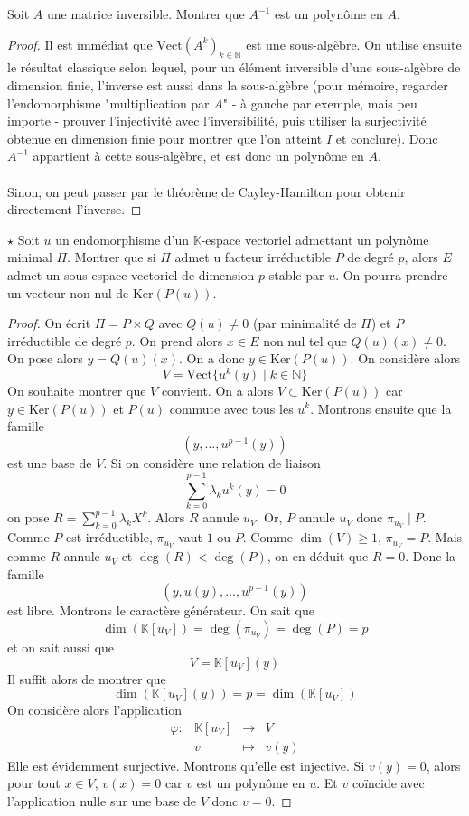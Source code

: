 \documentclass[french,a4paper]{article}
\newcommand{\N}{\mathbb{N}}
\newcommand{\K}{\mathbb{K}}
\newcommand{\inv}{^{-1}}
\renewcommand{\ker}{\text{Ker}}
\theoremstyle{plain}
\theoremstyle{definition}
\theoremstyle{remark}
\begin{document}
\begin{ex}{}
	Soit $A$ une matrice inversible. Montrer que $A\inv$ est un polynôme en $A$.
\end{ex}
\begin{proof}
	Il est immédiat que $\text{Vect}(A^k)_{k\in\N}$ est une sous-algèbre. On utilise ensuite le résultat classique selon lequel, pour un élément inversible d'une sous-algèbre de dimension finie, l'inverse est aussi dans la sous-algèbre (pour mémoire, regarder l'endomorphisme "multiplication par $A$" - à gauche par exemple, mais peu importe - prouver l'injectivité avec l'inversibilité, puis utiliser la surjectivité obtenue en dimension finie pour montrer que l'on atteint $I$ et conclure). Donc $A\inv$ appartient à cette sous-algèbre, et est donc un polynôme en $A$. \\ \\ Sinon, on peut passer par le théorème de Cayley-Hamilton pour obtenir directement l'inverse.
\end{proof}

\begin{ex}{$\star$}
	Soit $u$ un endomorphisme d'un $\K$-espace vectoriel admettant un polynôme minimal $\Pi$. Montrer que si $\Pi$ admet u facteur irréductible $P$ de degré $p$, alors $E$ admet un sous-espace vectoriel de dimension $p$ stable par $u$. On pourra prendre un vecteur non nul de $\ker(P(u))$.
\end{ex}
\begin{proof}
	On écrit $\Pi=P\times Q$ avec $Q(u)\ne0$ (par minimalité de $\Pi$) et $P$ irréductible de degré $p$. On prend alors $x\in E$ non nul tel que $Q(u)(x)\ne0$. On pose alors $y=Q(u)(x)$. On a donc $y\in\ker(P(u))$. On considère alors $$V=\text{Vect}\{u^k(y)\mid k\in\N\}$$ On souhaite montrer que $V$ convient. On a alors $V\subset \ker(P(u))$ car $y\in\ker(P(u))$ et $P(u)$ commute avec tous les $u^k$. Montrons ensuite que la famille $$(y,\ldots,u^{p-1}(y))$$ est une base de $V$. Si on considère une relation de liaison $$\sum_{k=0}^{p-1}\lambda_k u^k(y)=0$$ on pose $R=\displaystyle\sum_{k=0}^{p-1}\lambda_k X^k$. Alors $R$ annule $u_V$. Or, $P$ annule $u_V$ donc $\pi_{u_V}\mid P$. Comme $P$ est irréductible, $\pi_{u_V}$ vaut $1$ ou $P$. Comme $\dim(V)\geqslant1$, $\pi_{u_V}=P$. Mais comme $R$ annule $u_V$ et $\deg(R)<\deg(P)$, on en déduit que $R=0$. Donc la famille $$(y,u(y),\ldots,u^{p-1}(y))$$ est libre. Montrons le caractère générateur. On sait que $$\dim(\K[u_V])=\deg(\pi_{u_V})=\deg(P)=p$$ et on sait aussi que $$V=\K[u_V](y)$$ Il suffit alors de montrer que $$\dim(\K[u_V](y))=p=\dim(\K[u_V])$$ On considère alors l'application $$\begin{array}{lrcl}
		\varphi:&\K[u_V]&\longrightarrow&V\\
		&v&\longmapsto&v(y)
	\end{array}$$ Elle est évidemment surjective. Montrons qu'elle est injective. Si $v(y)=0$, alors pour tout $x\in V$, $v(x)=0$ car $v$ est un polynôme en $u$. Et $v$ coïncide avec l'application nulle sur une base de $V$ donc $v=0$.
\end{proof}
\end{document}
